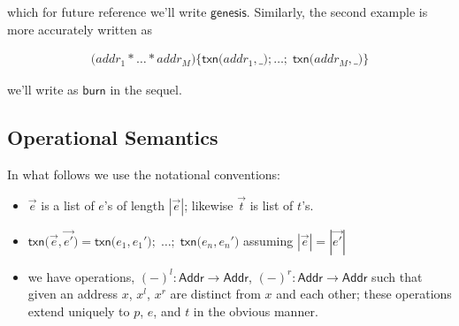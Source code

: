 \documentclass[]{acm_proc_article-sp}
\numberwithin{equation}{subsection}
\begin{document}
which for future reference we'll write $\mathsf{genesis}$. Similarly,
the second example is more accurately written as

\begin{equation*}
  \begin{aligned} 
    \mathsf{(} addr_1 * \ldots * addr_M {)} \mathsf{\{} \mathsf{txn}\mathsf{(} addr_1, \mathsf{\_} \mathsf{)} \mathsf{;} \ldots \mathsf{;} \; \mathsf{txn}\mathsf{(}addr_M, \mathsf{\_} \mathsf{)} \mathsf{\}}
  \end{aligned} 
\end{equation*}

we'll write as $\mathsf{burn}$ in the sequel.

\subsection{Operational Semantics}

In what follows we use the notational conventions:
\begin{itemize}
  \item $\vec{e}$ is a list of $e$'s of length $|\vec{e}|$; likewise $\vec{t}$ is list of $t$'s.
  \item $\mathsf{txn}\mathsf{(} \vec{e}, \vec{e'} \mathsf{)} = \mathsf{txn}\mathsf{(} e_1, e_1' \mathsf{)}\mathsf{;}\; \ldots \mathsf{;} \; \mathsf{txn}\mathsf{(} e_n, e_n' \mathsf{)}$ assuming $|\vec{e}| = |\vec{e'}|$
  \item we have operations, $( - )^l : \mathsf{Addr} \to \mathsf{Addr}$, $( - )^r : \mathsf{Addr} \to \mathsf{Addr}$ such that given an address $x$, $x^l$, $x^r$ are distinct from $x$ and each other; these operations extend uniquely to $p$, $e$, and $t$ in the obvious manner.
\end{itemize}

\begin{mathpar}
\end{mathpar}

\begin{mathpar}
\end{mathpar}

\begin{mathpar}
\end{mathpar}
\end{document}
